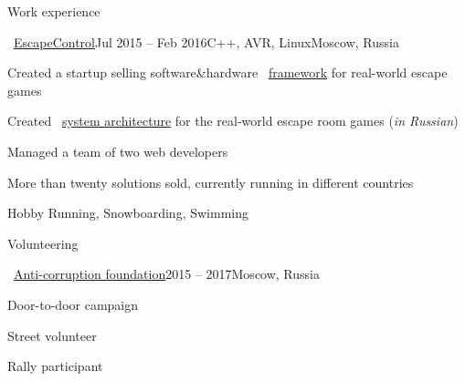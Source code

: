 \documentclass{resume} %
\begin{document}
\begin{rSection}{Work experience}

\begin{rSubsection}{\faExternalLink~\href{http://escapecontrol.ru/index_en.html}{EscapeControl}}{Jul 2015 -- Feb 2016}{C++, AVR, Linux}{Moscow, Russia}
	\item Created a startup selling software\&hardware \faExternalLink~\href{http://demo:demo@ec3.pagekite.escapecontrol.ru}{framework} for real-world escape games
	\item Created \faExternalLink~\href{http://habr.ru/p/258585/}{system architecture} for the real-world escape room games ({\em in Russian})
	\item Managed a team of two web developers
	\item More than twenty solutions sold, currently running in different countries
\end{rSubsection}


		
\end{rSection}

\begin{rSection}{Hobby}
	Running, Snowboarding, Swimming
\end{rSection}

\begin{rSection}{Volunteering}
	\begin{rSubsection}{\faExternalLink~\href{https://fbk.info/english/about/}{Anti-corruption foundation}}{2015 -- 2017}{Moscow, Russia}{}
		\item Door-to-door campaign
		\item Street volunteer
		\item Rally participant
	\end{rSubsection}
\end{rSection}
\end{document}
